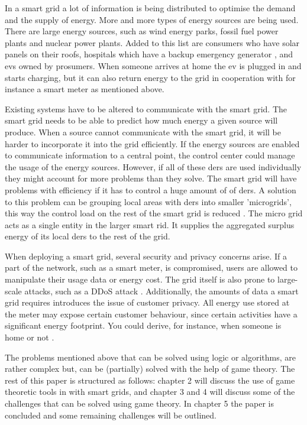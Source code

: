 In a smart grid a lot of information is being distributed to optimise the demand and the supply of energy. More and more types of energy sources are being used. There are large energy sources, such as wind energy parks, fossil fuel power plants and nuclear power plants. Added to this list are consumers who have solar panels on their roofs, hospitals which have a backup emergency generator \cite{Kumagai2012}, and \glspl{ev} owned by prosumers. When someone arrives at home the \gls{ev} is plugged in and starts charging, but it can also return energy to the grid in cooperation with for instance a smart meter as mentioned above.

Existing systems have to be altered to communicate with the smart grid. The smart grid needs to be able to predict how much energy a given source will produce. When a source cannot communicate with the smart grid, it will be harder to incorporate it into the grid efficiently. If the energy sources are enabled to communicate information to a central point, the control center could manage the usage of the energy sources. However, if all of these \glspl{der} are used individually they might account for more problems than they solve. The smart grid will have problems with efficiency if it has to control a huge amount of of \glspl{der}. A solution to this problem can be grouping local areas with \glspl{der} into smaller 'microgrids', this way the control load on the rest of the smart grid is reduced \cite{HatziargyriouAsanoIravaniMarnay2007}. The micro grid acts as a single entity in the larger smart rid. It supplies the aggregated surplus energy of its local \glspl{der} to the rest of the grid. 

When deploying a smart grid, several security and privacy concerns arise.  If a part of the network, such as a smart meter, is compromised, users are allowed to manipulate their usage data or energy cost. The grid itself is also prone to large-scale attacks, such as a DDoS attack \cite{McDanielMcLaughlin2009a}. Additionally, the amounts of data a smart grid requires introduces the issue of customer privacy. All energy use stored at the meter may expose certain customer behaviour, since certain activities have a significant energy footprint. You could derive, for instance, when someone is home or not \cite{Molina-MarkhamShenoyFuEtAl2010}.

The problems mentioned above that can be solved using logic or algorithms, are rather complex but, can be (partially) solved with the help of game theory. The rest of this paper is structured as follows: chapter 2 will discuss the use of game theoretic tools in with smart grids, and chapter 3 and 4 will discuss some of the challenges that can be solved using game theory. In chapter 5 the paper is concluded and some remaining challenges will be outlined.

